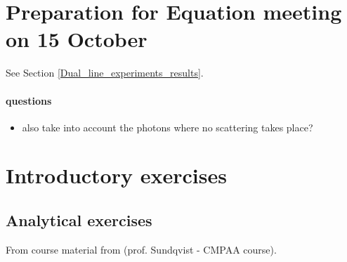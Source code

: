 \documentclass[../main/main.tex]{subfiles}
\begin{document}
\section{Preparation for Equation meeting on 15 October}
See Section \underline{\ref{Dual_line_experiments_results}}.

\paragraph{questions}
\begin{itemize}
\item also take into account the photons where no scattering takes place?
\end{itemize}

\newpage
\section{Introductory exercises}

\subsection{Analytical exercises}
From course material from (prof. Sundqvist - CMPAA course).
\end{document}
